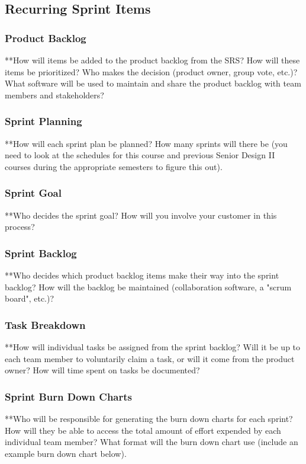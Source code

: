\subsection{Recurring Sprint Items}

\subsubsection{Product Backlog}
**How will items be added to the product backlog from the SRS? How will these items be prioritized? Who makes the decision (product owner, group vote, etc.)? What software will be used to maintain and share the product backlog with team members and stakeholders?

\subsubsection{Sprint Planning}
**How will each sprint plan be planned? How many sprints will there be (you need to look at the schedules for this course and previous Senior Design II courses during the appropriate semesters to figure this out).

\subsubsection{Sprint Goal}
**Who decides the sprint goal? How will you involve your customer in this process?

\subsubsection{Sprint Backlog}
**Who decides which product backlog items make their way into the sprint backlog? How will the backlog be maintained (collaboration software, a "scrum board", etc.)?

\subsubsection{Task Breakdown}
**How will individual tasks be assigned from the sprint backlog? Will it be up to each team member to voluntarily claim a task, or will it come from the product owner? How will time spent on tasks be documented?

\subsubsection{Sprint Burn Down Charts}
**Who will be responsible for generating the burn down charts for each sprint? How will they be able to access the total amount of effort expended by each individual team member? What format will the burn down chart use (include an example burn down chart below).

